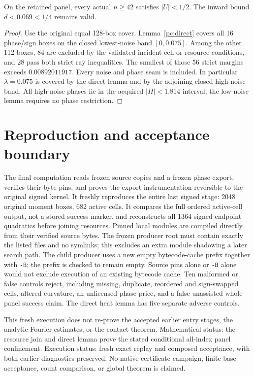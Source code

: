 \documentclass[11pt]{article}
\begin{document}
\begin{proposition}
On the retained panel, every actual $n\ge42$ satisfies $|U|<1/2$.
The inward bound $d<0.069<1/4$ remains valid.
\end{proposition}
\begin{proof}
Use the original equal 128-box cover. Lemma~\ref{pc:direct} covers all
16 phase/sign boxes on the closed lowest-noise band $[0,0.075]$.
Among the other 112 boxes, 84 are excluded by the validated incident-cell
or resource conditions, and 28 pass both strict ray inequalities.
The smallest of those 56 strict margins exceeds $0.00892011917$.
Every noise and phase seam is included. In particular $\lambda=0.075$
is covered by the direct lemma and by the adjoining closed high-noise
band. All high-noise phases lie in the acquired $|H|<1.814$ interval;
the low-noise lemma requires no phase restriction.
\end{proof}

\section{Reproduction and acceptance boundary}
The final computation reads frozen source copies and a frozen phase export,
verifies their byte pins, and proves the export instrumentation reversible
to the original signed kernel. It freshly reproduces the entire last
signed stage: 2048 original moment boxes, 682 active cells. It compares
the full ordered active-cell output, not a stored success marker, and
reconstructs all 1364 signed endpoint quadratics before joining resources.
Pinned local modules are compiled directly from their verified source bytes.
The frozen producer root must contain exactly the listed files and no
symlinks; this excludes an extra module shadowing a later search path.
The child producer uses a new empty bytecode-cache prefix together with
\texttt{-B}; the prefix is checked to remain empty. Source pins alone or
\texttt{-B} alone would not exclude execution of an existing bytecode cache.
Ten malformed or false controls reject, including missing, duplicate,
reordered and sign-swapped cells, altered curvature, an unlicensed phase
price, and a false unassisted whole-panel success claim. The direct heat
lemma has five separate adverse controls.

This fresh execution does not re-prove the accepted earlier entry stages,
the analytic Fourier estimates, or the contact theorem. Mathematical
status: the resource join and direct lemma prove the stated conditional
all-index panel confinement. Execution status: fresh exact replay and
composed acceptance, with both earlier diagnostics preserved. No native
certificate campaign, finite-base acceptance, count comparison, or global
theorem is claimed.
\end{document}
